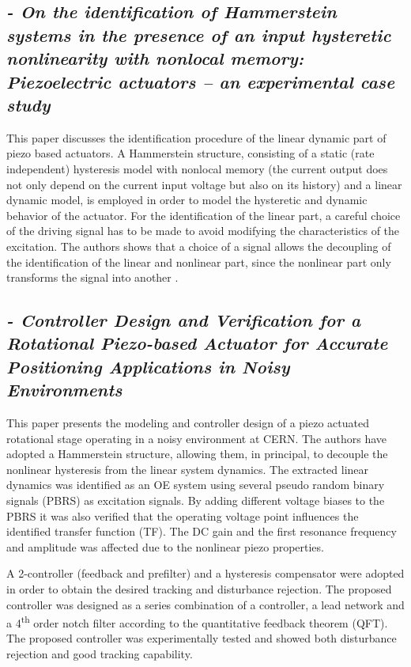 \subsection*{\citep*{ButcherIdentification:2015}{\small \emph{- On the identification of Hammerstein systems in the presence of an input hysteretic nonlinearity with nonlocal memory: Piezoelectric actuators – an experimental case study}}}
This paper discusses the identification procedure of the linear dynamic part of piezo based actuators. A Hammerstein structure, consisting of a static (rate independent) hysteresis model with nonlocal memory (the current output does not only depend on the current input voltage but also on its history) and a linear dynamic model, is employed in order to model the hysteretic and dynamic behavior of the actuator. For the identification of the linear part, a careful choice of the driving signal has to be made to avoid modifying the characteristics of the excitation. The authors shows that a choice of a \abbrPBRS signal allows the decoupling of the identification of the linear and nonlinear part, since the nonlinear part only transforms the \abbrPBRS signal into another \abbrPBRS.

\subsection*{\citep*{ButcherController:2015} {\small \emph{- Controller Design and Verification for a Rotational Piezo-based Actuator for Accurate Positioning Applications in Noisy Environments}} }
This paper presents the modeling and controller design of a piezo actuated rotational stage operating in a noisy environment at CERN. The authors have adopted a Hammerstein structure, allowing them, in principal, to decouple the nonlinear hysteresis from the linear system dynamics. The extracted linear dynamics was identified as an OE system using several pseudo random binary signals (PBRS) as excitation signals. By adding different voltage biases to the PBRS it was also verified that the operating voltage point influences the identified transfer function (TF). The DC gain and the first resonance frequency and amplitude was affected due to the nonlinear piezo properties.

A 2-\abbrDOF controller (feedback and prefilter) and a hysteresis compensator were adopted in order to obtain the desired tracking and disturbance rejection. The proposed controller was designed as a series combination of a \abbrPID controller, a lead network and a 4\textsuperscript{th} order notch filter according to the quantitative feedback theorem (QFT). The proposed controller was experimentally tested and showed both disturbance rejection and good tracking capability.

